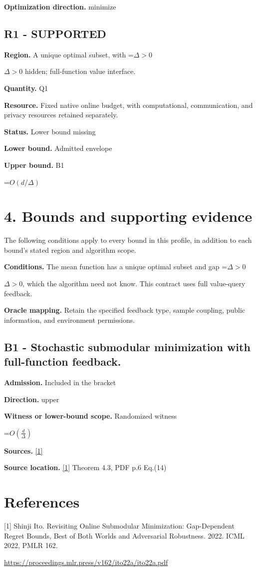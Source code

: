 \documentclass[10pt,a4paper]{article}
\newcommand{\AtlasMath}[1]{\par\begingroup\centering\setbox0=\hbox{$\displaystyle #1$}\ifdim\wd0>1.4\linewidth\typeout{ATLAS WIDE FORMULA: \the\wd0}\fi\ifdim\wd0>\linewidth\resizebox{\linewidth}{!}{\box0}\else\box0\fi\par\endgroup}
\newcommand{\AtlasInlineMath}[1]{\begingroup\setbox0=\hbox{$#1$}\ifdim\wd0>.4\linewidth\endgroup\AtlasMath{#1}\else\endgroup$#1$\fi}
\begin{document}
\textbf{Optimization direction.} minimize

\subsection{R1 - SUPPORTED}
\textbf{Region.} A unique optimal subset, with \AtlasInlineMath{\Delta>0} hidden; full-function value interface.

\textbf{Quantity.} Q1

\textbf{Resource.} Fixed native online budget, with computational, communication, and privacy resources retained separately.

\textbf{Status.} Lower bound missing

\textbf{Lower bound.} Admitted envelope

\textbf{Upper bound.} B1

\AtlasMath{O(d/\Delta)}
\section{4. Bounds and supporting evidence}
The following conditions apply to every bound in this profile, in addition to each bound's stated region and algorithm scope.

\textbf{Conditions.} The mean function has a unique optimal subset and gap \AtlasInlineMath{\Delta>0}, which the algorithm need not know. This contract uses full value-query feedback.

\textbf{Oracle mapping.} Retain the specified feedback type, sample coupling, public information, and environment permissions.

\subsection{B1 - Stochastic submodular minimization with full-function feedback.}
\textbf{Admission.} Included in the bracket

\textbf{Direction.} upper

\textbf{Witness or lower-bound scope.} Randomized witness

\AtlasMath{O\!\left(\frac d\Delta\right)}
\textbf{Sources.} \href{https://proceedings.mlr.press/v162/ito22a/ito22a.pdf}{[1]}

\textbf{Source location.} \href{https://proceedings.mlr.press/v162/ito22a/ito22a.pdf}{[1]} Theorem 4.3, PDF p.6 Eq.(14)

\section{References}
[1] Shinji Ito. Revisiting Online Submodular Minimization: Gap-Dependent Regret Bounds, Best of Both Worlds and Adversarial Robustness. 2022. ICML 2022, PMLR 162.

\url{https://proceedings.mlr.press/v162/ito22a/ito22a.pdf}
\end{document}
